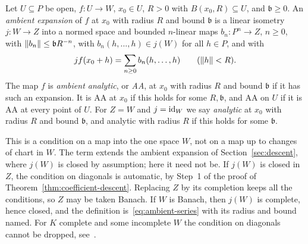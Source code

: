 \begin{definition}[some $j$]\label{amb:def:aa}
Let $U\subseteq P$ be open, $f\colon U\to W$, $x_0\in U$, $R>0$ with $B(x_0,R)\subseteq U$, and $\mathfrak b\ge0$. An \emph{ambient expansion} of $f$ at $x_0$ with radius $R$ and bound $\mathfrak b$ is a linear isometry $j\colon W\to Z$ into a normed space and bounded $n$-linear maps $b_n\colon P^n\to Z$, $n\ge0$, with $\lVert b_n\rVert\le \mathfrak bR^{-n}$, with $b_n(h,\dots,h)\in j(W)$ for all $h\in P$, and with
\begin{equation}\label{amb:eq:aa}
 jf(x_0+h)=\sum_{n\ge0}b_n(h,\dots,h)\qquad(\lVert h\rVert<R).
\end{equation}
The map $f$ is \emph{ambient analytic}, or \emph{AA}, at $x_0$ with radius $R$ and bound $\mathfrak b$ if it has such an expansion. It is AA at $x_0$ if this holds for some $R,\mathfrak b$, and AA on $U$ if it is AA at every point of $U$. For $Z=W$ and $j=\mathrm{id}_W$ we say \emph{analytic} at $x_0$ with radius $R$ and bound $\mathfrak b$, and analytic with radius $R$ if this holds for some $\mathfrak b$.
\end{definition}

This is a condition on a map into the one space $W$, not on a map up to changes of chart in $W$. The term extends the ambient expansion of Section~\ref{sec:descent}, where $j(W)$ is closed by assumption; here it need not be. If $j(W)$ is closed in $Z$, the condition on diagonals is automatic, by Step~1 of the proof of Theorem~\ref{thm:coefficient-descent}. Replacing $Z$ by its completion keeps all the conditions, so $Z$ may be taken Banach. If $W$ is Banach, then $j(W)$ is complete, hence closed, and the definition is~\eqref{eq:ambient-series} with its radius and bound named. For $K$ complete and some incomplete $W$ the condition on diagonals cannot be dropped, see~\cite{II}.

